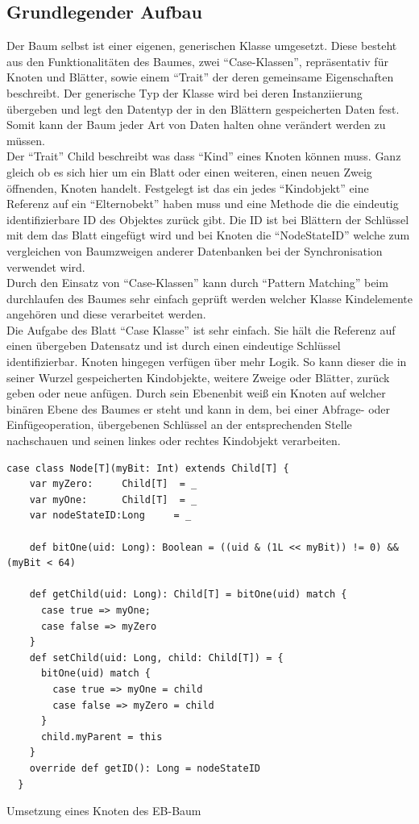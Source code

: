\documentclass[a4paper,11pt,oneside,%
headsepline,												%
footsepline,												%
bibtotocnumbered									%
]{scrreprt}
\begin{document}
\subsection{Grundlegender Aufbau}
Der Baum selbst ist einer eigenen, generischen Klasse umgesetzt. Diese besteht aus den Funktionalitäten des Baumes, zwei \enquote{Case-Klassen}, repräsentativ für Knoten und Blätter, sowie einem \enquote{Trait} der deren gemeinsame Eigenschaften beschreibt. Der generische Typ der Klasse wird bei deren Instanziierung übergeben und legt den Datentyp der in den Blättern gespeicherten Daten fest. Somit kann der Baum jeder Art von Daten halten ohne verändert werden zu müssen.\\
Der \enquote{Trait} Child beschreibt was dass \enquote{Kind} eines Knoten können muss. Ganz gleich ob es sich hier um ein Blatt oder einen weiteren, einen neuen Zweig öffnenden, Knoten handelt. Festgelegt ist das ein jedes \enquote{Kindobjekt} eine Referenz auf ein \enquote{Elternobekt} haben muss und eine Methode die die eindeutig identifizierbare ID des Objektes zurück gibt. Die ID ist bei Blättern der Schlüssel mit dem das Blatt eingefügt wird und bei Knoten die \enquote{NodeStateID} welche zum vergleichen von Baumzweigen anderer Datenbanken bei der Synchronisation verwendet wird.\\
Durch den Einsatz von \enquote{Case-Klassen} kann durch \enquote{Pattern Matching} beim durchlaufen des Baumes sehr einfach geprüft werden welcher Klasse Kindelemente angehören und diese verarbeitet werden.\\
Die Aufgabe des Blatt \enquote{Case Klasse} ist sehr einfach. Sie hält die Referenz auf einen übergeben Datensatz und ist durch einen eindeutige Schlüssel identifizierbar. Knoten hingegen verfügen über mehr Logik. So kann dieser die in seiner Wurzel gespeicherten Kindobjekte, weitere Zweige oder Blätter, zurück geben oder neue anfügen. Durch sein Ebenenbit weiß ein Knoten auf welcher binären Ebene des Baumes er steht und kann in dem, bei einer Abfrage- oder Einfügeoperation, übergebenen Schlüssel an der entsprechenden Stelle nachschauen und seinen linkes oder rechtes Kindobjekt verarbeiten.

\begin{listing}[H]
	\begin{verbatim}
case class Node[T](myBit: Int) extends Child[T] {
    var myZero:     Child[T]  = _
    var myOne:      Child[T]  = _
    var nodeStateID:Long     = _

    def bitOne(uid: Long): Boolean = ((uid & (1L << myBit)) != 0) && (myBit < 64)

    def getChild(uid: Long): Child[T] = bitOne(uid) match {
      case true => myOne;
      case false => myZero
    }
    def setChild(uid: Long, child: Child[T]) = {
      bitOne(uid) match {
        case true => myOne = child
        case false => myZero = child
      }
      child.myParent = this
    }
    override def getID(): Long = nodeStateID
  }	
	\end{verbatim}
	\caption{Umsetzung eines Knoten des \ac{EB-Baum}}
	\label{lst:Knoten EB-Baum}
\end{listing}
\end{document}
